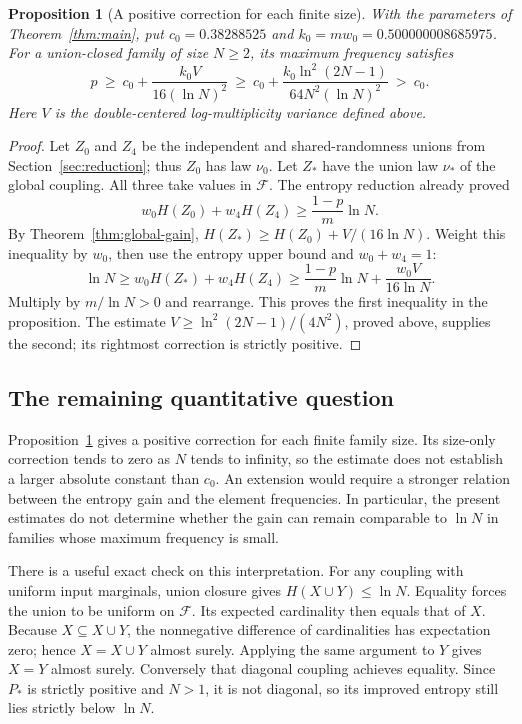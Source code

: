 \documentclass[11pt]{article}
\newtheorem{proposition}[theorem]{Proposition}
\theoremstyle{remark}
\newcommand{\F}{\mathcal F}
\begin{document}
\begin{proposition}[A positive correction for each finite size]
\label{prop:global-frequency}
With the parameters of Theorem~\ref{thm:main}, put
\(c_0=0.38288525\) and \(k_0=mw_0=0.500000008685975\).
For a union-closed family of size \(N\ge2\), its maximum frequency
satisfies
\[
\boxed{\displaystyle
p\ \ge\ c_0+\frac{k_0V}{16(\ln N)^2}
\ \ge\ c_0+
\frac{k_0\ln^2(2N-1)}{64N^2(\ln N)^2}
\ >\ c_0.}
\]
Here \(V\) is the double-centered log-multiplicity variance defined
above.
\end{proposition}
\begin{proof}
Let \(Z_0\) and \(Z_4\) be the independent and shared-randomness unions
from Section~\ref{sec:reduction}; thus \(Z_0\) has law \(\nu_0\).
Let \(Z_*\) have the union law \(\nu_*\) of the global coupling.
All three take values in \(\F\).
The entropy reduction already proved
\[
w_0H(Z_0)+w_4H(Z_4)\ge \frac{1-p}{m}\ln N.
\]
By Theorem~\ref{thm:global-gain},
\(H(Z_*)\ge H(Z_0)+V/(16\ln N)\).
Weight this inequality by \(w_0\), then use the entropy upper bound
and \(w_0+w_4=1\):
\[
\ln N
\ge w_0H(Z_*)+w_4H(Z_4)
\ge \frac{1-p}{m}\ln N+\frac{w_0V}{16\ln N}.
\]
Multiply by \(m/\ln N>0\) and rearrange. This proves the first
inequality in the proposition. The estimate
\(V\ge\ln^2(2N-1)/(4N^2)\), proved above, supplies the second;
its rightmost correction is strictly positive.
\end{proof}

\subsection{The remaining quantitative question}
Proposition~\ref{prop:global-frequency} gives a positive correction for
each finite family size. Its size-only correction tends to zero as
\(N\) tends to infinity, so the estimate does not establish a larger
absolute constant than \(c_0\).
An extension would require a stronger relation between the entropy gain
and the element frequencies. In particular, the present estimates do
not determine whether the gain can remain comparable to \(\ln N\)
in families whose maximum frequency is small.

There is a useful exact check on this interpretation.
For any coupling with uniform input marginals, union closure gives
\(H(X\cup Y)\le\ln N\).
Equality forces the union to be uniform on \(\F\). Its expected
cardinality then equals that of \(X\).
Because \(X\subseteq X\cup Y\), the nonnegative difference of
cardinalities has expectation zero; hence \(X=X\cup Y\) almost surely.
Applying the same argument to \(Y\) gives \(X=Y\) almost surely.
Conversely that diagonal coupling achieves equality.
Since \(P_*\) is strictly positive and \(N>1\), it is not diagonal,
so its improved entropy still lies strictly below \(\ln N\).
\end{document}
